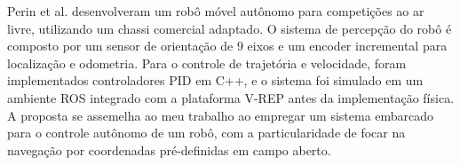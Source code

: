 Perin et al. \cite{KleytinhoBasico} desenvolveram um robô móvel autônomo para competições ao ar livre, utilizando um chassi comercial adaptado. O sistema de percepção do robô é composto por um sensor de orientação de 9 eixos e um encoder incremental para localização e odometria. Para o controle de trajetória e velocidade, foram implementados controladores PID em C++, e o sistema foi simulado em um ambiente ROS integrado com a plataforma V-REP antes da implementação física. A proposta se assemelha ao meu trabalho ao empregar um sistema embarcado para o controle autônomo de um robô, com a particularidade de focar na navegação por coordenadas pré-definidas em campo aberto.